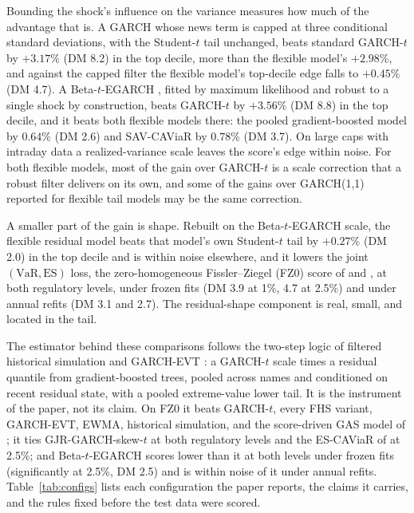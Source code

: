 \documentclass[11pt]{article}
\newcommand{\VaR}{\mathrm{VaR}}
\newcommand{\ES}{\mathrm{ES}}
\theoremstyle{remark}
\begin{document}
Bounding the shock's influence on the variance measures how much of the advantage that is. A GARCH whose news term is capped at three conditional standard deviations, with the Student-$t$ tail unchanged, beats standard GARCH-$t$ by $+3.17\%$ (DM 8.2) in the top decile, more than the flexible model's $+2.98\%$, and against the capped filter the flexible model's top-decile edge falls to $+0.45\%$ (DM 4.7). A Beta-$t$-EGARCH \citep{harvey2013dynamic}, fitted by maximum likelihood and robust to a single shock by construction, beats GARCH-$t$ by $+3.56\%$ (DM 8.8) in the top decile, and it beats both flexible models there: the pooled gradient-boosted model by $0.64\%$ (DM 2.6) and SAV-CAViaR by $0.78\%$ (DM 3.7). On large caps with intraday data a realized-variance scale leaves the score's edge within noise. For both flexible models, most of the gain over GARCH-$t$ is a scale correction that a robust filter delivers on its own, and some of the gains over GARCH(1,1) reported for flexible tail models may be the same correction.

A smaller part of the gain is shape. Rebuilt on the Beta-$t$-EGARCH scale, the flexible residual model beats that model's own Student-$t$ tail by $+0.27\%$ (DM 2.0) in the top decile and is within noise elsewhere, and it lowers the joint $(\VaR,\ES)$ loss, the zero-homogeneous Fissler--Ziegel (FZ0) score of \citet{fissler2016} and \citet{patton2019}, at both regulatory levels, under frozen fits (DM 3.9 at 1\%, 4.7 at 2.5\%) and under annual refits (DM 3.1 and 2.7). The residual-shape component is real, small, and located in the tail.

The estimator behind these comparisons follows the two-step logic of filtered historical simulation and GARCH-EVT \citep{baroneadesi1999fhs, mcneilfrey2000}: a GARCH-$t$ scale times a residual quantile from gradient-boosted trees, pooled across names and conditioned on recent residual state, with a pooled extreme-value lower tail. It is the instrument of the paper, not its claim. On FZ0 it beats GARCH-$t$, every FHS variant, GARCH-EVT, EWMA, historical simulation, and the score-driven GAS model of \citet{patton2019}; it ties GJR-GARCH-skew-$t$ at both regulatory levels and the ES-CAViaR of \citet{taylor2019} at 2.5\%; and Beta-$t$-EGARCH scores lower than it at both levels under frozen fits (significantly at 2.5\%, DM 2.5) and is within noise of it under annual refits. Table~\ref{tab:configs} lists each configuration the paper reports, the claims it carries, and the rules fixed before the test data were scored.
\end{document}
